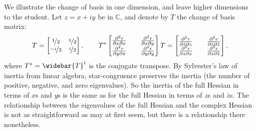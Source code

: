\documentclass[12pt,openany]{book}
\newcommand{\C}{{\mathbb{C}}}
\theoremstyle{plain}
\theoremstyle{remark}
\theoremstyle{definition}
\theoremstyle{exercise}
\theoremstyle{example}
\begin{document}
We illustrate the change of basis in one dimension, and leave higher
dimensions to the student.  Let $z =
x+iy$ be in $\C$, and denote by $T$ the change of basis matrix:
\begin{equation*}
T =
\begin{bmatrix}
\nicefrac{1}{2} & \nicefrac{1}{2} \\
\nicefrac{-i}{2} & \nicefrac{i}{2}
\end{bmatrix}
,
\qquad
T^*
\begin{bmatrix}
\frac{\partial^2 r}{\partial x \partial x} &&
\frac{\partial^2 r}{\partial x \partial y}
\\
\frac{\partial^2 r}{\partial y \partial x} &&
\frac{\partial^2 r}{\partial y \partial y}
\end{bmatrix}
T
=
\begin{bmatrix}
\frac{\partial^2 r}{\partial \bar{z} \partial z} &&
\frac{\partial^2 r}{\partial \bar{z} \partial \bar{z}}
\\
\frac{\partial^2 r}{\partial z \partial z} &&
\frac{\partial^2 r}{\partial z \partial \bar{z}}
\end{bmatrix}
,
\end{equation*}
where
%
$T^* = \widebar{T}^t$ is the conjugate transpose.
By Sylvester's law of inertia from linear algebra, star-congruence
preserves the inertia (the number of positive, negative, and zero
eigenvalues).  So the
inertia of the full Hessian in terms of $x$s and $y$s is the same
as for the full Hessian in terms of $z$s and $\bar{z}$s.
The relationship between the eigenvalues of the full Hessian and the complex
Hessian is not as straightforward as may at first seem, but there is
a relationship there nonetheless.
\end{document}
